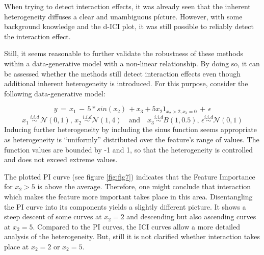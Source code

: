 \documentclass[
]{krantz}
\begin{document}
When trying to detect interaction effects, it was already seen that the inherent heterogeneity diffuses a clear and unambiguous pícture. However, with some background knowledge and the d-ICI plot, it was still possible to reliably detect the interaction effect.

Still, it seems reasonable to further validate the robustness of these methods within a data-generative model with a non-linear relationship. By doing so, it can be assessed whether the methods still detect interaction effects even though additional inherent heterogeneity is introduced. For this purpose, consider the following data-generative model:

\[y \, = \, x_{1} \,  - \, 5*sin(x_{2}) \, + x_{3} + 5x_{2} 1_{x_2 > 2, x_3 = 0} \, + \, \epsilon\]
\[ x_{1} \, \overset{i.i.d}{\sim} \, \mathcal{N}(0,1), \, x_{2} \, \overset{i.i.d}{\sim}  \mathcal{N}(1, 4) \quad \text{and} \quad x_{3} \overset{i.i.d}{\sim} B(1, 0.5),\,  \epsilon \overset{i.i.d}{\sim} \mathcal{N}(0, 1)\]
Inducing further heterogeneity by including the sinus function seems appropriate as heterogeneity is ``uniformly'' distributed over the feature's range of values. The function values are bounded by -1 and 1, so that the heterogeneity is controlled and does not exceed extreme values.

The plotted PI curve (see figure \ref{fig:fig7}) indicates that the Feature Importance for \(x_2 > 5\) is above the average. Therefore, one might conclude that interaction which makes the feature more important takes place in this area. Disentangling the PI curve into its components yields a slightly different picture. It shows a steep descent of some curves at \(x_2 = 2\) and descending but also ascending curves at \(x_2 = 5\). Compared to the PI curves, the ICI curves allow a more detailed analysis of the heterogeneity. But, still it is not clarified whether interaction takes place at \(x_2 = 2\) or \(x_2 = 5\).
\end{document}
